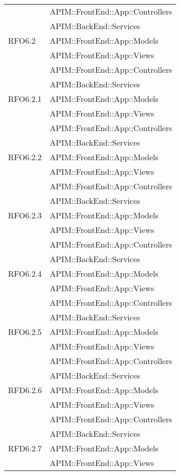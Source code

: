 \begin{longtable}{ p{4cm} | p{12cm} }
			& APIM::FrontEnd::App::Controllers \\
			& APIM::BackEnd::Services \\
			\hline		
			RFO6.2
			& APIM::FrontEnd::App::Models \\
			& APIM::FrontEnd::App::Views \\
			& APIM::FrontEnd::App::Controllers \\
			& APIM::BackEnd::Services \\
			\hline		
			RFO6.2.1
			& APIM::FrontEnd::App::Models \\
			& APIM::FrontEnd::App::Views \\
			& APIM::FrontEnd::App::Controllers \\
			& APIM::BackEnd::Services \\
			\hline		
			RFO6.2.2
			& APIM::FrontEnd::App::Models \\
			& APIM::FrontEnd::App::Views \\
			& APIM::FrontEnd::App::Controllers \\
			& APIM::BackEnd::Services \\
			\hline		
			RFO6.2.3
			& APIM::FrontEnd::App::Models \\
			& APIM::FrontEnd::App::Views \\
			& APIM::FrontEnd::App::Controllers \\
			& APIM::BackEnd::Services \\
			\hline		
			RFO6.2.4
			& APIM::FrontEnd::App::Models \\
			& APIM::FrontEnd::App::Views \\
			& APIM::FrontEnd::App::Controllers \\
			& APIM::BackEnd::Services \\
			\hline		
			RFO6.2.5
			& APIM::FrontEnd::App::Models \\
			& APIM::FrontEnd::App::Views \\
			& APIM::FrontEnd::App::Controllers \\
			& APIM::BackEnd::Services \\
			\hline		
			RFD6.2.6
			& APIM::FrontEnd::App::Models \\
			& APIM::FrontEnd::App::Views \\
			& APIM::FrontEnd::App::Controllers \\
			& APIM::BackEnd::Services \\
			\hline		
			RFD6.2.7
			& APIM::FrontEnd::App::Models \\
			& APIM::FrontEnd::App::Views \\

\end{longtable}
